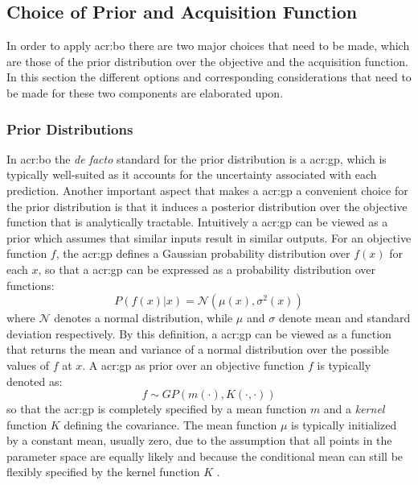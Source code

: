 \subsection{Choice of Prior and Acquisition Function}
\label{sec:bayesian-optimization-prior-acquisition}
In order to apply \acrlong{acr:bo} there are two major choices that need to be made, which are those of the prior distribution over the objective and the acquisition function. In this section the different options and corresponding considerations that need to be made for these two components are elaborated upon.

\subsubsection*{Prior Distributions}
\label{sec:bayesian-optimization-prior}
In \acrlong{acr:bo} the \textit{de facto} standard for the prior distribution is a \acrfull{acr:gp}, which is typically well-suited as it accounts for the uncertainty associated with each prediction.
Another important aspect that makes a \acrshort{acr:gp} a convenient choice for the prior distribution is that it induces a posterior distribution over the objective function that is analytically tractable.
Intuitively a \acrshort{acr:gp} can be viewed as a prior which assumes that similar inputs result in similar outputs.
For an objective function $f$, the \acrshort{acr:gp} defines a Gaussian probability distribution over $f(x)$ for each $x$, so that a \acrshort{acr:gp} can be expressed as a probability distribution over functions:
\begin{equation}
	P(f(x) \vert x) = \mathcal{N}(\mu(x), \sigma^2(x))
\end{equation}
where $\mathcal{N}$ denotes a normal distribution, while $\mu$ and $\sigma$ denote mean and standard deviation respectively.
By this definition, a \acrshort{acr:gp} can be viewed as a function that returns the mean and variance of a normal distribution over the possible values of $f$ at $x$. A \acrshort{acr:gp} as prior over an objective function $f$ is typically denoted as: 
\begin{equation}
\label{eq:gp}
f \sim GP(m(\cdot), K(\cdot, \cdot))
\end{equation}
so that the \acrshort{acr:gp} is completely specified by a mean function $m$ and a \textit{kernel} function $K$ defining the covariance.
The mean function $\mu$ is typically initialized by a constant mean, usually zero, due to the assumption that all points in the parameter space are equally likely and because the conditional mean can still be flexibly specified by the kernel function $K$ \cite{kawaguchi2015bayesian}.

